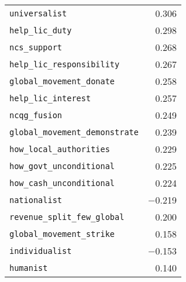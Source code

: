 \begin{tabular}[h]{lr}
\verb|universalist| & 0.306\\
\verb|help_lic_duty| & 0.298\\
\verb|ncs_support| & 0.268\\
\verb|help_lic_responsibility| & 0.267\\
\verb|global_movement_donate| & 0.258\\
\verb|help_lic_interest| & 0.257\\
\verb|ncqg_fusion| & 0.249\\
\verb|global_movement_demonstrate| & 0.239\\
\verb|how_local_authorities| & 0.229\\
\verb|how_govt_unconditional| & 0.225\\
\verb|how_cash_unconditional| & 0.224\\
\verb|nationalist| & $-$0.219\\
\verb|revenue_split_few_global| & 0.200\\
\verb|global_movement_strike| & 0.158\\
\verb|individualist| & $-$0.153\\
\verb|humanist| & 0.140\\
\bottomrule
\end{tabular}
